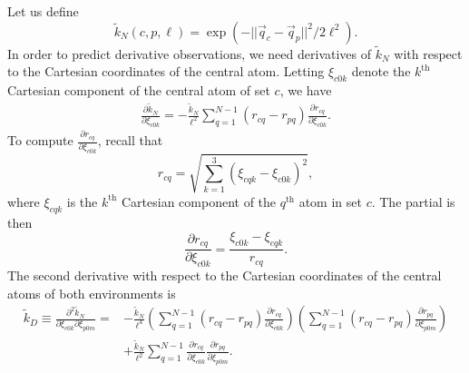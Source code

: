 \documentclass[%
preprint,
amsmath,amssymb,
aps,
]{revtex4-1}
\begin{document}
Let us define
\begin{equation}
    \tilde{k}_N(c,p, \ell) = \exp(-||\vec{q}_c - \vec{q}_p||^2 / 2 \ell^2).
\end{equation}
In order to predict derivative observations, we need derivatives of $\tilde{k}_N$ with respect to the Cartesian coordinates of the central atom. Letting $\xi_{c0k}$ denote the $k^{\text{th}}$ Cartesian component of the central atom of set $c$, we have
\begin{equation}
    \begin{split}
    \frac{\partial \tilde{k}_N}{\partial \xi_{c0k}} = -\frac{\tilde{k}_N}{\ell^2} \sum_{q=1}^{N-1} (r_{cq} - r_{pq}) \frac{\partial r_{cq}}{\partial \xi_{c0k}}.
    \end{split}
\end{equation}
To compute $\frac{\partial r_{cq}}{\partial \xi_{c0k}}$, recall that
\begin{equation}
    r_{cq} = \sqrt{\sum_{k=1}^3 (\xi_{cqk} - \xi_{c0k})^2},
\end{equation}
where $\xi_{cqk}$ is the $k^{\text{th}}$ Cartesian component of the $q^{\text{th}}$ atom in set $c$. The partial is then
\begin{equation}
    \frac{\partial r_{cq}}{\partial \xi_{c0k}} = \frac{\xi_{c0k} - \xi_{cqk}}{r_{cq}}.
\end{equation}
The second derivative with respect to the Cartesian coordinates of the central atoms of both environments is
\begin{equation}
    \begin{split}
\tilde{k}_D \equiv \frac{\partial^2 \tilde{k}_N}{\partial \xi_{c0k} \partial \xi_{p0m}} = &-\frac{\tilde{k}_N}{\ell^4} \left( \sum_{q=1}^{N-1} (r_{cq} - r_{pq}) \frac{\partial r_{cq}}{\partial \xi_{c0k}} \right)\left( \sum_{q=1}^{N-1} (r_{cq} - r_{pq}) \frac{\partial r_{pq}}{\partial \xi_{p0m}} \right)\\
& +\frac{\tilde{k}_N}{\ell^2} \sum_{q=1}^{N-1} \frac{\partial r_{cq}}{\partial \xi_{c0k}} \frac{\partial r_{pq}}{\partial \xi_{p0m}}.
    \end{split}
\end{equation}
\end{document}
